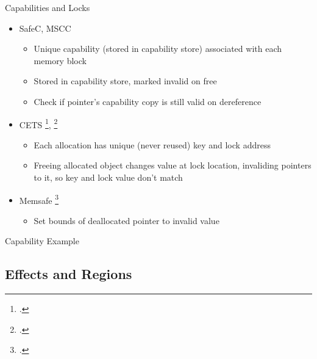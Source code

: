 \documentclass[aspectratio=169]{beamer}
\begin{document}
\begin{frame}{Capabilities and Locks}
    \begin{itemize}
        \item SafeC, MSCC %
            \begin{itemize}
              \item Unique capability (stored in capability store) associated with each memory block
              \item Stored in capability store, marked invalid on free
              \item Check if pointer's capability copy is still valid on dereference
            \end{itemize}
        \item CETS \footcite{nagarakatte_cets:_2010}, \footcite{nagarakatte_everything_2015}
            \begin{itemize}
                \item Each allocation has unique (never reused) key and lock address 
                \item Freeing allocated object changes value at lock location, invaliding pointers to it, so key and lock value don't match
            \end{itemize}
        \item Memsafe \footcite{simpson_memsafe:_2013}
            \begin{itemize}
                \item Set bounds of deallocated pointer to invalid value %
            \end{itemize}
    \end{itemize}
\end{frame}

\begin{frame}{Capability Example}
\end{frame}

\subsection{Effects and Regions}
\end{document}
